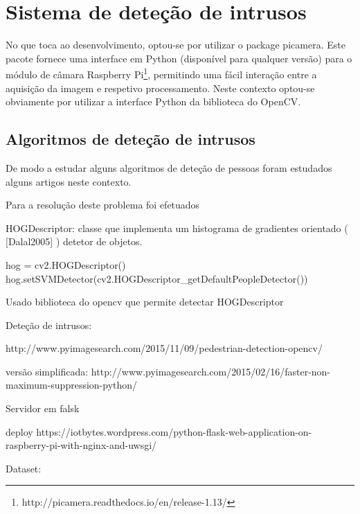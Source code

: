 \newpage
\section{Sistema de deteção de intrusos}





No que toca ao desenvolvimento, optou-se por utilizar o package picamera. Este pacote fornece  uma interface em Python (disponível para qualquer versão) para o módulo de câmara Raspberry Pi\footnote{http://picamera.readthedocs.io/en/release-1.13/}, permitindo uma fácil interação entre a aquisição da imagem e respetivo processamento. Neste contexto optou-se obviamente por utilizar a interface Python da biblioteca do OpenCV.



\subsection{Algoritmos de deteção de intrusos}

De modo a estudar alguns algoritmos de deteção de pessoas foram estudados alguns artigos neste contexto. 


Para a resolução deste problema foi efetuados 


HOGDescriptor: classe que implementa um histograma de gradientes orientado ( [Dalal2005] ) detetor de objetos. 

hog = cv2.HOGDescriptor()
hog.setSVMDetector(cv2.HOGDescriptor\_getDefaultPeopleDetector())




Usado biblioteca do opencv que permite detectar 
HOGDescriptor


Deteção de intrusos: 

http://www.pyimagesearch.com/2015/11/09/pedestrian-detection-opencv/



versão simplificada: http://www.pyimagesearch.com/2015/02/16/faster-non-maximum-suppression-python/



Servidor em falsk 


deploy 
https://iotbytes.wordpress.com/python-flask-web-application-on-raspberry-pi-with-nginx-and-uwsgi/



Dataset: %


